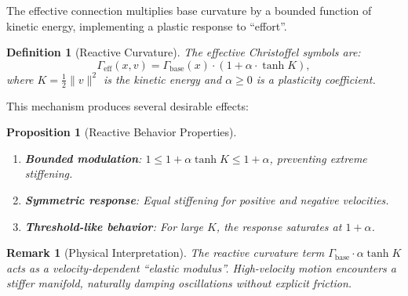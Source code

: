 \documentclass[12pt,letterpaper,twoside]{article}
\newtheorem{definition}{Definition}[section]
\newtheorem{remarque}{Remark}[section]
\newtheorem{prop}{Proposition}[section]
\begin{document}
The effective connection multiplies base curvature by a bounded function of kinetic energy, implementing a plastic response to ``effort''.

\begin{definition}[Reactive Curvature]
The effective Christoffel symbols are:
\[
\Gamma_{\text{eff}}(x, v) = \Gamma_{\text{base}}(x) \cdot \left(1 + \alpha \cdot \tanh K\right),
\]
where $K = \frac{1}{2}\|v\|^2$ is the kinetic energy and $\alpha \geq 0$ is a plasticity coefficient.
\end{definition}

This mechanism produces several desirable effects:

\begin{prop}[Reactive Behavior Properties]
\begin{enumerate}
\item \textbf{Bounded modulation}: $1 \leq 1 + \alpha \tanh K \leq 1 + \alpha$, preventing extreme stiffening.
\item \textbf{Symmetric response}: Equal stiffening for positive and negative velocities.
\item \textbf{Threshold-like behavior}: For large $K$, the response saturates at $1 + \alpha$.
\end{enumerate}
\end{prop}

\begin{remarque}[Physical Interpretation]
The reactive curvature term $\Gamma_{\text{base}} \cdot \alpha \tanh K$ acts as a velocity-dependent ``elastic modulus''. High-velocity motion encounters a stiffer manifold, naturally damping oscillations without explicit friction.
\end{remarque}
\end{document}
